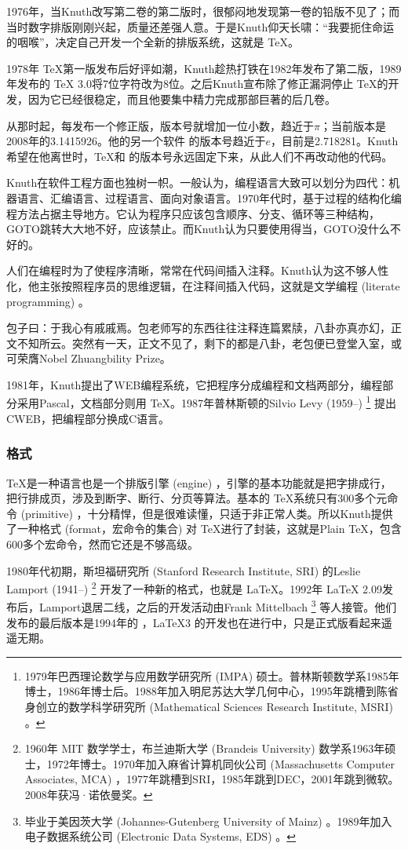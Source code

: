 1976年，当Knuth改写第二卷的第二版时，很郁闷地发现第一卷的铅版不见了；而当时数字排版刚刚兴起，质量还差强人意。于是Knuth仰天长啸：“我要扼住命运的咽喉”，决定自己开发一个全新的排版系统，这就是 \TeX。

1978年 \TeX 第一版发布后好评如潮，Knuth趁热打铁在1982年发布了第二版，1989年发布的 \TeX{} 3.0将7位字符改为8位。之后Knuth宣布除了修正漏洞停止 \TeX 的开发，因为它已经很稳定，而且他要集中精力完成那部巨著的后几卷。

从那时起，每发布一个修正版，版本号就增加一位小数，趋近于$\pi$；当前版本是2008年的3.1415926。他的另一个软件 \MF 的版本号趋近于$e$，目前是2.718281。Knuth希望在他离世时，\TeX 和 \MF 的版本号永远固定下来，从此人们不再改动他的代码。

Knuth在软件工程方面也独树一帜。一般认为，编程语言大致可以划分为四代：机器语言、汇编语言、过程语言、面向对象语言。1970年代时，基于过程的结构化编程方法占据主导地方。它认为程序只应该包含顺序、分支、循环等三种结构，GOTO跳转大大地不好，应该禁止。而Knuth认为只要使用得当，GOTO没什么不好的。

人们在编程时为了使程序清晰，常常在代码间插入注释。Knuth认为这不够人性化，他主张按照程序员的思维逻辑，在注释间插入代码，这就是文学编程 (literate programming) 。

包子曰：于我心有戚戚焉。包老师写的东西往往注释连篇累牍，八卦亦真亦幻，正文不知所云。突然有一天，正文不见了，剩下的都是八卦，老包便已登堂入室，或可荣膺Nobel Zhuangbility Prize。

1981年，Knuth提出了WEB编程系统，它把程序分成编程和文档两部分，编程部分采用Pascal，文档部分则用 \TeX。1987年普林斯顿的Silvio Levy (1959--)\indexLevy{}  \footnote{1979年巴西理论数学与应用数学研究所 (IMPA) 硕士。普林斯顿数学系1985年博士，1986年博士后。1988年加入明尼苏达大学几何中心，1995年跳槽到陈省身创立的数学科学研究所 (Mathematical Sciences Research Institute, MSRI) 。} 提出CWEB，把编程部分换成C语言。

\subsubsection{格式}

\TeX 是一种语言也是一个排版引擎 (engine) ，引擎的基本功能就是把字排成行，把行排成页，涉及到断字、断行、分页等算法。基本的 \TeX 系统只有300多个元命令 (primitive) ，十分精悍，但是很难读懂，只适于非正常人类。所以Knuth提供了一种格式 (format，宏命令的集合) 对 \TeX 进行了封装，这就是Plain \TeX ，包含600多个宏命令，然而它还是不够高级。

1980年代初期，斯坦福研究所 (Stanford Research Institute, SRI) 的Leslie Lamport (1941--)\indexLamport{} \footnote{1960年 MIT 数学学士，布兰迪斯大学 (Brandeis University) 数学系1963年硕士，1972年博士。1970年加入麻省计算机同伙公司 (Massachusetts Computer Associates, MCA) ，1977年跳槽到SRI，1985年跳到DEC，2001年跳到微软。2008年获冯·诺依曼奖。} 开发了一种新的格式，也就是 \LaTeX。1992年 \LaTeX{} 2.09发布后，Lamport退居二线，之后的开发活动由Frank Mittelbach\indexMittelbach{} \footnote{毕业于美因茨大学 (Johannes-Gutenberg University of Mainz) 。1989年加入电子数据系统公司 (Electronic Data Systems, EDS) 。} 等人接管。他们发布的最后版本是1994年的 \LaTeXe，\LaTeX 3 的开发也在进行中，只是正式版看起来遥遥无期。

